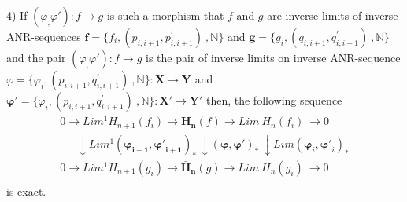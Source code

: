 \documentclass[10pt]{article}
\theoremstyle{definition}
\begin{document}
4) If $( {\varphi }_,{\varphi'} ):f\to g$  is such a morphism that $f$ and $g$ are inverse limits of inverse ANR-sequences  $\mathbf{f}= \{ {{f}_{i}},({{p}_{i,i+1}},p_{i,i+1}^{'})~,\mathbb{N} \}$ and $\mathbf{g}= \{ {{g}_{i}},({{q}_{i,i+1}},q_{i,i+1}^{'})~,\mathbb{N} \}$ and the pair $( {\varphi }_,{\varphi'} ):f\to g$ is the pair of inverse limits on inverse ANR-sequence ${\mathbb {\varphi}}= \{ {{\varphi}_{i}},({{p}_{i,i+1}},q_{i,i+1}^{'})~,\mathbb{N} \} : { \mathbf{X} \to \mathbf{Y}}$ and ${\mathbf{\varphi'}}= \{ {{\varphi}_{i}},({{p}_{i,i+1}},q_{i,i+1}^{'})~,\mathbb{N} \}: { \mathbf{X'} \to \mathbf{Y'}}$ then, the following sequence 
$$
\begin{matrix}
   0\to Li{{m}^{1}}{{H}_{n+1}}( {{f}_{i}} )\to {{\mathbf{\bar{H}}}_{\mathbf{n}}}( f )\to Lim~{{H}_{n}}( {{f}_{i}} )~\to 0  \\
   ~~~~~~~\downarrow Li{{m}^{1}} \left( {{\mathbf{\varphi_{i+1} }}},\mathbf{{\varphi'}_{i+1} } \right)_{*}~\downarrow \left( {{\mathbf{\varphi }}},\mathbf{{\varphi}' } \right)_{*}~\downarrow Lim \left( {{\mathbf{\varphi }}}_{i},{\mathbf{{\varphi}'}_{i} } \right)_{*} \\
   0\to Li{{m}^{1}}{{H}_{n+1}}( {{g}_{i}} )\to {{\mathbf{\bar{H}}}_{\mathbf{n}}}( g )\to Lim~{{H}_{n}}( {{g}_{i}} )~\to 0  \\
\end{matrix}
$$
is exact.
\end{document}
